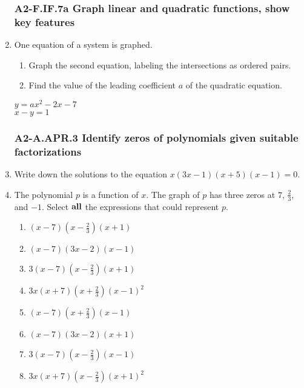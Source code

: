 \documentclass[12pt, twoside]{article}
\begin{document}
\begin{enumerate}[itemsep=0.5cm]
\newpage
\subsubsection*{A2-F.IF.7a Graph linear and quadratic functions, show key features}
\item One equation of a system is graphed. 
\begin{enumerate}
    \item Graph the second equation, labeling the intersections as ordered pairs.
    \item Find the value of the leading coefficient $a$ of the quadratic equation.
\end{enumerate}
    \begin{multicols}{2}
      \hspace{1cm} $y = ax^2 - 2x - 7$ \\
      \columnbreak
      $x - y = 1$
      \end{multicols}
       \vspace{3cm}
  
    \begin{center}
    \end{center}
  

\newpage
\subsubsection*{A2-A.APR.3 Identify zeros of polynomials given suitable factorizations}
\item Write down the solutions to the equation $x(3x - 1)(x + 5)(x - 1) = 0$. \vspace{2cm} 

\item The polynomial $p$ is a function of $x$. The graph of $p$ has three zeros at $7$, $\frac{2}{3}$, and $-1$. Select $\bf{all}$ the expressions that could represent $p$. \vspace{0.25cm}
    \begin{multicols}{2}
    \begin{enumerate}
        \item $(x-7)(x-\frac{2}{3})(x+1)$
        \item $(x-7)(3x-2)(x-1)$
        \item $3(x-7)(x-\frac{2}{3})(x+1)$
        \item $3x(x+7)(x+\frac{2}{3})(x-1)^2$
        \item $(x-7)(x+\frac{2}{3})(x-1)$
        \item $(x-7)(3x-2)(x+1)$
        \item $3(x-7)(x-\frac{2}{3})(x-1)$
        \item $3x(x+7)(x-\frac{2}{3})(x+1)^2$
    \end{enumerate}
    \end{multicols}


\end{enumerate}
\end{document}
